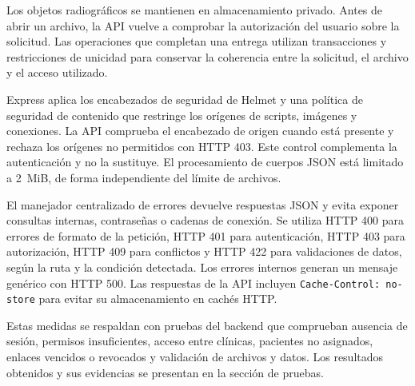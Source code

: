 Los objetos radiográficos se mantienen en almacenamiento privado. Antes
de abrir un archivo, la API vuelve a comprobar la autorización del usuario
sobre la solicitud. Las operaciones que completan una entrega utilizan
transacciones y restricciones de unicidad para conservar la coherencia
entre la solicitud, el archivo y el acceso utilizado.

Express aplica los encabezados de seguridad de Helmet y una política de
seguridad de contenido que restringe los orígenes de scripts, imágenes y
conexiones. La API comprueba el encabezado de origen cuando está presente
y rechaza los orígenes no permitidos con HTTP 403. Este control complementa
la autenticación y no la sustituye. El procesamiento de cuerpos JSON está
limitado a \mbox{2 MiB}, de forma independiente del límite de archivos.

El manejador centralizado de errores devuelve respuestas JSON y evita
exponer consultas internas, contraseñas o cadenas de conexión. Se utiliza
HTTP 400 para errores de formato de la petición, HTTP 401 para autenticación,
HTTP 403 para autorización, HTTP 409 para conflictos y HTTP 422 para
validaciones de datos, según la ruta y la condición detectada. Los errores
internos generan un mensaje genérico con HTTP 500. Las respuestas de la
API incluyen \texttt{Cache-Control: no-store} para evitar su almacenamiento
en cachés HTTP.

Estas medidas se respaldan con pruebas del backend que comprueban ausencia
de sesión, permisos insuficientes, acceso entre clínicas, pacientes no
asignados, enlaces vencidos o revocados y validación de archivos y datos.
Los resultados obtenidos y sus evidencias se presentan en la sección de pruebas.
